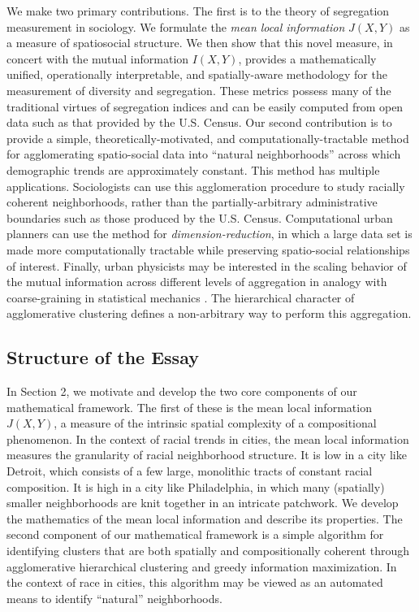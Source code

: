 	We make two primary contributions. The first is to the theory of segregation measurement in sociology. We formulate the \emph{mean local information} $J(X,Y)$ as a measure of spatiosocial structure. We then show that this novel measure, in concert with the mutual information $I(X,Y)$, provides a mathematically unified, operationally interpretable, and spatially-aware methodology for the measurement of diversity and segregation. These metrics possess many of the traditional virtues of segregation indices and can be easily computed from open data such as that provided by the U.S. Census. Our second contribution is to provide a simple, theoretically-motivated, and computationally-tractable method for agglomerating spatio-social data into ``natural neighborhoods'' across which demographic trends are approximately constant. This method has multiple applications. Sociologists can use this agglomeration procedure to study racially coherent neighborhoods, rather than the partially-arbitrary administrative boundaries such as those produced by the U.S. Census. Computational urban planners can use the method for \emph{dimension-reduction}, in which a large data set is made more computationally tractable while preserving spatio-social relationships of interest. Finally, urban physicists may be interested in the scaling behavior of the mutual information across different levels of aggregation in analogy with coarse-graining in statistical mechanics \cite{Bettencourt2015}. The hierarchical character of agglomerative clustering defines a non-arbitrary way to perform this aggregation. 

\subsection*{Structure of the Essay}
	In Section 2, we motivate and develop the two core components of our mathematical framework. The first of these is the mean local information $J(X,Y)$, a measure of the intrinsic spatial complexity of a compositional phenomenon. In the context of racial trends in cities, the mean local information measures the granularity of racial neighborhood structure. It is low in a city like Detroit, which consists of a few large, monolithic tracts of constant racial composition. It is high in a city like Philadelphia, in which many (spatially) smaller neighborhoods are knit together in an intricate patchwork. We develop the mathematics of the mean local information and describe its properties. The second component of our mathematical framework is a simple algorithm for identifying clusters that are both spatially and compositionally coherent through agglomerative hierarchical clustering and greedy information maximization. In the context of race in cities, this algorithm may be viewed as an automated means to identify ``natural'' neighborhoods. 

